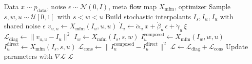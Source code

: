 \begin{algorithm}[htbp]
\caption{Meta Flow Map (MFM) Training}
\label{alg:meta_flow_maps}
\begin{algorithmic}[1]
\Require Data $x \sim p_{\text{data}}$, noise $\epsilon \sim \mathcal{N}(0,I)$, meta flow map $X_{\text{mfm}}$, optimizer
\State Sample $s, w, u \sim \mathcal{U}[0,1]$ with $s < w < u$
\State Build stochastic interpolants $I_s, I_w, I_u$ with shared noise $\epsilon$
\State $v_{u,u} \gets X_{\text{mfm}}(I_u, u, u)$ 
\State $\dot{I}_u \gets \dot{\alpha}_u \, x + \dot{\beta}_u \, \epsilon + \dot{\gamma}_u \, \xi$ 
\State $\mathcal{L}_{\text{diag}} \gets \| v_{u,u} - \dot{I}_u \|^2$ 
\State $I_w \gets X_{\text{mfm}}(I_s, s, w)$ 
\State $I_{u}^{\text{composed}} \gets X_{\text{mfm}}(I_w, w, u)$ 
\State $I_{u}^{\text{direct}} \gets X_{\text{mfm}}(I_s, s, u)$ 
\State $\mathcal{L}_{\text{cons}} \gets \| I_{u}^{\text{composed}} - I_{u}^{\text{direct}} \|^2$ 
\State $\mathcal{L} \gets \mathcal{L}_{\text{diag}} + \mathcal{L}_{\text{cons}}$
\State Update parameters with $\nabla \mathcal{L}$
\State \Return $\mathcal{L}$
\end{algorithmic}
\end{algorithm}
